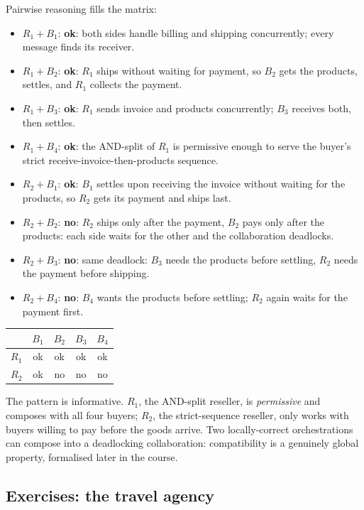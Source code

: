 Pairwise reasoning fills the matrix:
\begin{itemize}
  \item $R_1 + B_1$: \textbf{ok}: both sides handle billing and shipping concurrently; every message finds its receiver.
  \item $R_1 + B_2$: \textbf{ok}: $R_1$ ships without waiting for payment, so $B_2$ gets the products, settles, and $R_1$ collects the payment.
  \item $R_1 + B_3$: \textbf{ok}: $R_1$ sends invoice and products concurrently; $B_3$ receives both, then settles.
  \item $R_1 + B_4$: \textbf{ok}: the AND-split of $R_1$ is permissive enough to serve the buyer's strict receive-invoice-then-products sequence.
  \item $R_2 + B_1$: \textbf{ok}: $B_1$ settles upon receiving the invoice without waiting for the products, so $R_2$ gets its payment and ships last.
  \item $R_2 + B_2$: \textbf{no}: $R_2$ ships only after the payment, $B_2$ pays only after the products: each side waits for the other and the collaboration deadlocks.
  \item $R_2 + B_3$: \textbf{no}: same deadlock: $B_3$ needs the products before settling, $R_2$ needs the payment before shipping.
  \item $R_2 + B_4$: \textbf{no}: $B_4$ wants the products before settling; $R_2$ again waits for the payment first.
\end{itemize}
\begin{center}
\begin{tabular}{c|cccc}
      & $B_1$ & $B_2$ & $B_3$ & $B_4$ \\
\hline
$R_1$ & ok    & ok    & ok    & ok    \\
$R_2$ & ok    & no    & no    & no    \\
\end{tabular}
\end{center}
The pattern is informative. $R_1$, the AND-split reseller, is \emph{permissive} and composes with all four buyers; $R_2$, the strict-sequence reseller, only works with buyers willing to pay before the goods arrive. Two locally-correct orchestrations can compose into a deadlocking collaboration: compatibility is a genuinely global property, formalised later in the course.

\subsection{Exercises: the travel agency}

